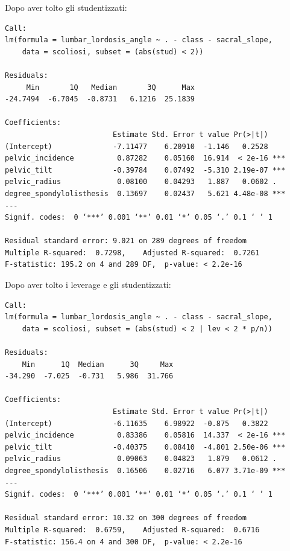 \documentclass{beamer}
\begin{document}
\begin{frame}[fragile]
	Dopo aver tolto gli studentizzati:

	{\tiny
	\begin{verbatim}
Call:
lm(formula = lumbar_lordosis_angle ~ . - class - sacral_slope, 
    data = scoliosi, subset = (abs(stud) < 2))

Residuals:
     Min       1Q   Median       3Q      Max 
-24.7494  -6.7045  -0.8731   6.1216  25.1839 

Coefficients:
                         Estimate Std. Error t value Pr(>|t|)    
(Intercept)              -7.11477    6.20910  -1.146   0.2528    
pelvic_incidence          0.87282    0.05160  16.914  < 2e-16 ***
pelvic_tilt              -0.39784    0.07492  -5.310 2.19e-07 ***
pelvic_radius             0.08100    0.04293   1.887   0.0602 .  
degree_spondylolisthesis  0.13697    0.02437   5.621 4.48e-08 ***
---
Signif. codes:  0 ‘***’ 0.001 ‘**’ 0.01 ‘*’ 0.05 ‘.’ 0.1 ‘ ’ 1

Residual standard error: 9.021 on 289 degrees of freedom
Multiple R-squared:  0.7298,	Adjusted R-squared:  0.7261 
F-statistic: 195.2 on 4 and 289 DF,  p-value: < 2.2e-16
	\end{verbatim}
	}
\end{frame}





\begin{frame}[fragile]
	Dopo aver tolto i leverage e gli studentizzati:

	{\tiny
	\begin{verbatim}
Call:
lm(formula = lumbar_lordosis_angle ~ . - class - sacral_slope, 
    data = scoliosi, subset = (abs(stud) < 2 | lev < 2 * p/n))

Residuals:
    Min      1Q  Median      3Q     Max 
-34.290  -7.025  -0.731   5.986  31.766 

Coefficients:
                         Estimate Std. Error t value Pr(>|t|)    
(Intercept)              -6.11635    6.98922  -0.875   0.3822    
pelvic_incidence          0.83386    0.05816  14.337  < 2e-16 ***
pelvic_tilt              -0.40375    0.08410  -4.801 2.50e-06 ***
pelvic_radius             0.09063    0.04823   1.879   0.0612 .  
degree_spondylolisthesis  0.16506    0.02716   6.077 3.71e-09 ***
---
Signif. codes:  0 ‘***’ 0.001 ‘**’ 0.01 ‘*’ 0.05 ‘.’ 0.1 ‘ ’ 1

Residual standard error: 10.32 on 300 degrees of freedom
Multiple R-squared:  0.6759,	Adjusted R-squared:  0.6716 
F-statistic: 156.4 on 4 and 300 DF,  p-value: < 2.2e-16
	\end{verbatim}
	}
\end{frame}
\end{document}
